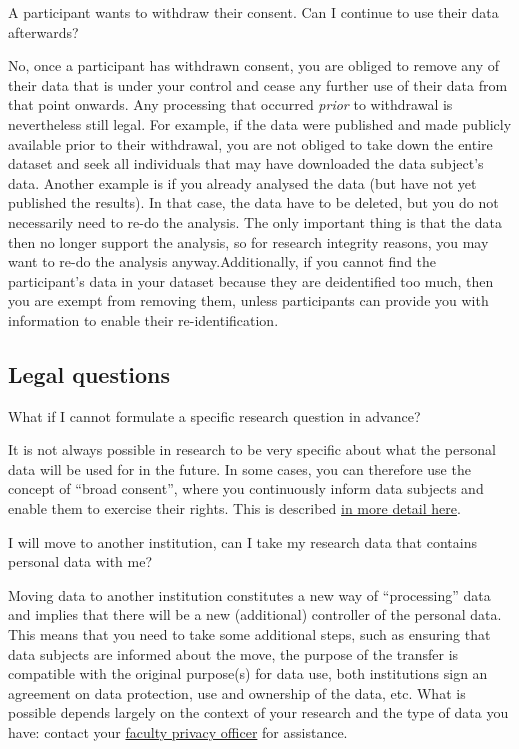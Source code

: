 \documentclass[
]{book}
\begin{document}
A participant wants to withdraw their consent. Can I continue to use their data afterwards?

No, once a participant has withdrawn consent, you are obliged to remove any of their data that is under your control and cease any further use of their data from that point onwards. Any processing that occurred \emph{prior} to withdrawal is nevertheless still legal. For example, if the data were published and made publicly available prior to their withdrawal, you are not obliged to take down the entire dataset and seek all individuals that may have downloaded the data subject's data. Another example is if you already analysed the data (but have not yet published the results). In that case, the data have to be deleted, but you do not necessarily need to re-do the analysis. The only important thing is that the data then no longer support the analysis, so for research integrity reasons, you may want to re-do the analysis anyway.Additionally, if you cannot find the participant's data in your dataset because they are deidentified too much, then you are exempt from removing them, unless participants can provide you with information to enable their re-identification.

\hypertarget{legal}{%
\subsection{Legal questions}\label{legal}}

What if I cannot formulate a specific research question in advance?

It is not always possible in research to be very specific about what the personal data will be used for in the future. In some cases, you can therefore use the concept of ``broad consent'', where you continuously inform data subjects and enable them to exercise their rights. This is described \protect\hyperlink{broad-consent}{in more detail here}.

I will move to another institution, can I take my research data that contains personal data with me?

Moving data to another institution constitutes a new way of ``processing'' data and implies that there will be a new (additional) controller of the personal data. This means that you need to take some additional steps, such as ensuring that data subjects are informed about the move, the purpose of the transfer is compatible with the original purpose(s) for data use, both institutions sign an agreement on data protection, use and ownership of the data, etc. What is possible depends largely on the context of your research and the type of data you have: contact your \href{https://intranet.uu.nl/en/knowledgebase/privacyofficers}{faculty privacy officer} for assistance.
\end{document}
